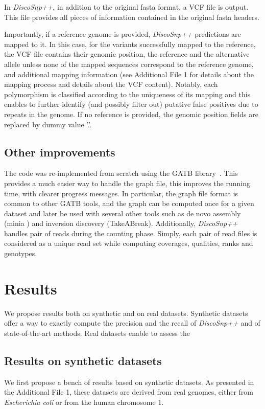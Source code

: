 \documentclass{bmcart}
\newcommand{\discopp}{{\it DiscoSnp++}\xspace}
\begin{document}
In \discopp, in addition to the original fasta format, a VCF file is output. This file provides all pieces of information contained in the original fasta headers.

Importantly, if a reference genome is provided, \discopp predictions are mapped to it. In this case, for the variants successfully mapped to the reference, the VCF file contains their genomic position, the reference and the alternative allele unless none of the mapped sequences correspond to the reference genome, and additional mapping information (see Additional File 1 for details about the mapping process and details about the VCF content). Notably, each polymorphism is classified according to the uniqueness of its mapping and this enables to further identify (and possibly filter out) putative false positives due to repeats in the genome.
If no reference is provided, the genomic position fields are replaced by dummy value '.'.

\subsection*{Other improvements}
The code was re-implemented from scratch using the GATB library~\cite{Drezen2014}. This provides a much easier way to handle the graph file, this improves the running time, with clearer progress messages. 
In particular, the graph file format is common to other GATB tools, and the graph can be computed once for a given dataset and later be used with several other tools such as de novo assembly (minia \cite{}) and inversion discovery (TakeABreak\cite{}). 
Additionally, \discopp handles pair of reads during the counting phase. Simply, each pair of read files is considered as a unique read set while computing coverages, qualities, ranks and genotypes. 


\section*{Results}
We propose results both on synthetic and on real datasets. Synthetic datasets offer a way to exactly compute the precision and the recall of \discopp and of state-of-the-art methods. Real datasets enable to assess the %

\subsection*{Results on synthetic datasets}
We first propose a bench of results based on synthetic datasets. As presented in the Additional File 1, these datasets are derived from real genomes, either from \emph{Escherichia coli} or from the human chromosome 1. 
\end{document}
